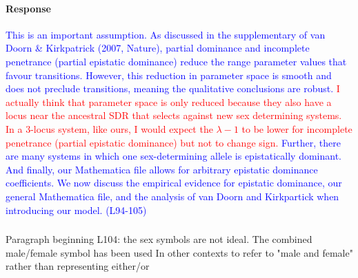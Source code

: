 \documentclass[10pt,letterpaper]{article}
\begin{document}
\noindent\paragraph{Response}
\textcolor{blue}{
This is an important assumption.
As discussed in the supplementary of van Doorn \& Kirkpatrick (2007, Nature), partial dominance and incomplete penetrance (partial epistatic dominance) reduce the range parameter values that favour transitions.
However, this reduction in parameter space is smooth and does not preclude transitions, meaning the qualitative conclusions are robust.
\textcolor{red}{I actually think that parameter space is only reduced because they also have a locus near the ancestral SDR that selects against new sex determining systems. In a 3-locus system, like ours, I would expect the $\lambda-1$ to be lower for incomplete penetrance (partial epistatic dominance) but not to change sign. }
Further, there are many systems in which one sex-determining allele is epistatically dominant.
And finally, our Mathematica file allows for arbitrary epistatic dominance coefficients.
We now discuss the empirical evidence for epistatic dominance, our general Mathematica file, and the analysis of van Doorn and Kirkpartick when introducing our model. (L94-105)
}
%

\noindent\subsubsection{}
Paragraph beginning L104: the sex symbols are not ideal. The combined male/female symbol has been used In other contexts to refer to "male and female" rather than representing either/or
\end{document}
